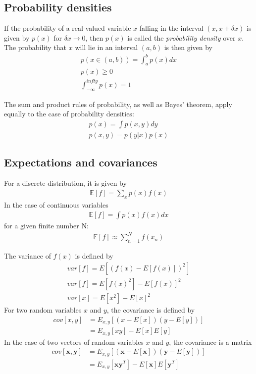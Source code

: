 \documentclass[a4paper]{article}
\begin{document}
\subsection{Probability densities}
If the probability of a real-valued variable $x$ falling in the
interval $(x, x + \delta x)$ is given by $p(x)$ for $\delta x \to 0$, then
$p(x)$ is called the \textit{probability density} over $x$. The probability that $x$ will lie in an interval $(a, b)$ is then given by
\begin{align}
p(x \in (a,b)) = \int_a^b p(x) dx\\
p(x) \geq 0\\
\int_{-\infty}^{infty} p(x) = 1
\end{align}

The sum and product rules of probability, as well as Bayes' theorem,
apply equally to the case of probability densities:
\begin{align}
p(x) = \int p(x,y)dy\\
p(x,y) = p(y|x) p(x)
\end{align}

\subsection{Expectations and covariances}
For a discrete distribution, it is given by
\begin{align}
\mathbb{E}[f] = \sum_x p(x)f(x)
\end{align}
In the case of continuous variables
\begin{align}
\mathbb{E}[f] = \int p(x)f(x) dx
\end{align}
for a given finite number N:
\begin{align}
\mathbb{E}[f] \approx \sum_{n=1}^N f(x_n)
\end{align}


The variance of $f(x)$ is defined by
\begin{align}
var[f] = E[ (f(x) -E[f(x)])^2 ]\\
var[f] = E[f(x)^2] -E[f(x)]^2\\
var[x] = E[x^2] -E[x]^2
\end{align}
For two random variables $x$ and $y$, the covariance is defined by
\begin{align*}
cov[x,y] &= E_{x,y}[ (x-E[x])(y-E[y]) ]\\
&= E_{x,y}[xy] - E[x]E[y]
\end{align*}
In the case of two vectors of random variables $x$ and $y$, the covariance is a matrix
\begin{align*}
cov[\mathbf{x},\mathbf{y}] &= E_{x,y} [ (\mathbf{x}-E[\mathbf{x}])(\mathbf{y}-E[\mathbf{y}]) ]\\
&= E_{x,y}[\mathbf{x}\mathbf{y}^T] - E[\mathbf{x}]E[\mathbf{y}^T]
\end{align*}
\end{document}
